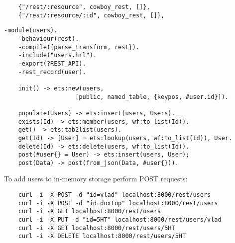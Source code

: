 \vspace{1\baselineskip}
\begin{lstlisting}
    {"/rest/:resource", cowboy_rest, []},
    {"/rest/:resource/:id", cowboy_rest, []},
\end{lstlisting}

\lstset{captionpos=b}
\vspace{1\baselineskip}
\begin{lstlisting}[caption=users.erl]
    -module(users).
    -behaviour(rest).
    -compile({parse_transform, rest}).
    -include("users.hrl").
    -export(?REST_API).
    -rest_record(user).

    init() -> ets:new(users,
                    [public, named_table, {keypos, #user.id}]).

    populate(Users) -> ets:insert(users, Users).
    exists(Id) -> ets:member(users, wf:to_list(Id)).
    get() -> ets:tab2list(users).
    get(Id) -> [User] = ets:lookup(users, wf:to_list(Id)), User.
    delete(Id) -> ets:delete(users, wf:to_list(Id)).
    post(#user{} = User) -> ets:insert(users, User);
    post(Data) -> post(from_json(Data, #user{})).
\end{lstlisting}
\vspace{1\baselineskip}

To add users to in-memory storage perform POST requests:

\vspace{1\baselineskip}
\begin{lstlisting}
    curl -i -X POST -d "id=vlad" localhost:8000/rest/users
    curl -i -X POST -d "id=doxtop" localhost:8000/rest/users
    curl -i -X GET localhost:8000/rest/users
    curl -i -X PUT -d "id=5HT" localhost:8000/rest/users/vlad
    curl -i -X GET localhost:8000/rest/users/5HT
    curl -i -X DELETE localhost:8000/rest/users/5HT
\end{lstlisting}
\vspace{1\baselineskip}

